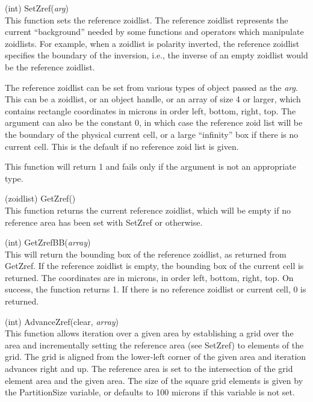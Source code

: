 \begin{description}
\item{(int) \vt SetZref({\it arg\/})}\\
This function sets the reference zoidlist.  The reference zoidlist
represents the current ``background'' needed by some functions and
operators which manipulate zoidlists.  For example, when a zoidlist is
polarity inverted, the reference zoidlist specifies the boundary of
the inversion, i.e., the inverse of an empty zoidlist would be the
reference zoidlist.

The reference zoidlist can be set from various types of object passed
as the {\it arg}.  This can be a zoidlist, or an object handle, or an
array of size 4 or larger, which contains rectangle coordinates in
microns in order left, bottom, right, top.  The argument can also be
the constant 0, in which case the reference zoid list will be the
boundary of the physical current cell, or a large ``infinity'' box if
there is no current cell.  This is the default if no reference zoid
list is given.

This function will return 1 and fails only if the argument is not
an appropriate type.

\item{(zoidlist) \vt GetZref()}\\
This function returns the current reference zoidlist, which will be
empty if no reference area has been set with {\vt SetZref} or
otherwise.

\item{(int) \vt GetZrefBB({\it array\/})}\\
This will return the bounding box of the reference zoidlist, as
returned from {\vt GetZref}.  If the reference zoidlist is empty, the
bounding box of the current cell is returned.  The coordinates are in
microns, in order left, bottom, right, top.  On success, the function
returns 1.  If there is no reference zoidlist or current cell, 0 is
returned.

\item{(int) \vt AdvanceZref({\vt clear\/}, {\it array\/})}\\
This function allows iteration over a given area by establishing a
grid over the area and incrementally setting the reference area (see
{\vt SetZref}) to elements of the grid.  The grid is aligned from the
lower-left corner of the given area and iteration advances right and
up.  The reference area is set to the intersection of the grid element
area and the given area.  The size of the square grid elements is
given by the {\et PartitionSize} variable, or defaults to 100 microns
if this variable is not set.


\end{description}
